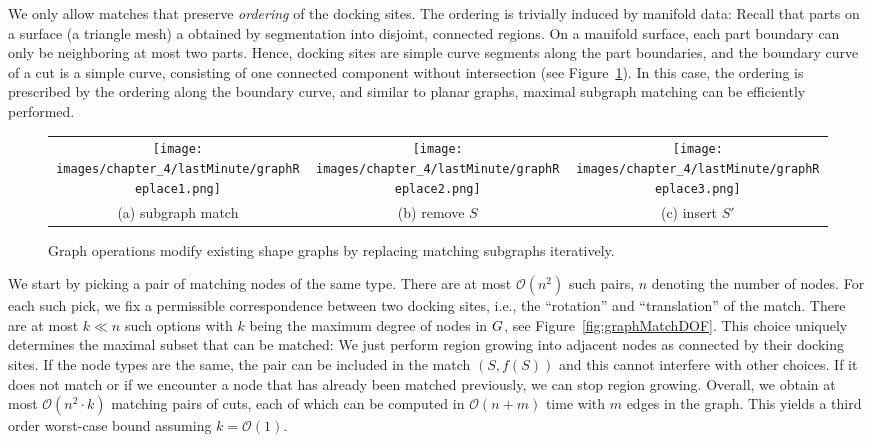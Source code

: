 We only allow  matches that preserve {\em ordering} of the docking sites. The ordering is trivially induced by manifold data: Recall that parts on a surface (a triangle mesh) a obtained by segmentation into disjoint, connected regions. On a manifold surface, each part boundary can only be neighboring at most two parts. Hence, docking sites are simple curve segments along the part boundaries, and the boundary curve of a cut is a simple curve, consisting of one connected component without intersection (see Figure~\ref{fig:graphReplace1}). In this case, the ordering is prescribed by the ordering along the boundary curve, and similar to planar graphs, maximal subgraph matching can be efficiently performed.

\begin{figure}[h!]
	\centering
	\begin{tabular}{ccc}
		\texttt{[image: images/chapter\_4/lastMinute/graphReplace1.png]} &
		\texttt{[image: images/chapter\_4/lastMinute/graphReplace2.png]} &
		\texttt{[image: images/chapter\_4/lastMinute/graphReplace3.png]} \\
		\small (a) subgraph match &
		\small (b) remove $S$ &
		\small (c) insert $S'$
	\end{tabular}
	\caption[Graph operations.]{Graph operations modify existing shape graphs by replacing matching subgraphs iteratively.}
	\label{fig:graphReplace1}
\end{figure}


We start by picking a pair of matching nodes of the same type. There are at most $\mathcal{O}(n^2)$ such pairs, $n$ denoting the number of nodes. For each such pick, we fix a permissible correspondence between two docking sites, i.e., the ``rotation'' and ``translation'' of the match. There are at most $k \ll n$ such options with $k$ being the maximum degree of nodes in $G$, see Figure~\ref{fig:graphMatchDOF}. This choice uniquely determines the maximal subset that can be matched: We just perform region growing into adjacent nodes as connected by their docking sites. If the node types are the same, the pair can be included in the match $(S,f(S))$ and this cannot interfere with other choices. If it does not match or if we encounter a node that has already been matched previously, we can stop region growing. Overall, we obtain at most $\mathcal{O}(n^2 \cdot k)$ matching pairs of cuts, each of which can be computed in $\mathcal{O}(n+m)$ time with $m$ edges in the graph. This yields a third order worst-case bound assuming $k = \mathcal{O}(1)$.


